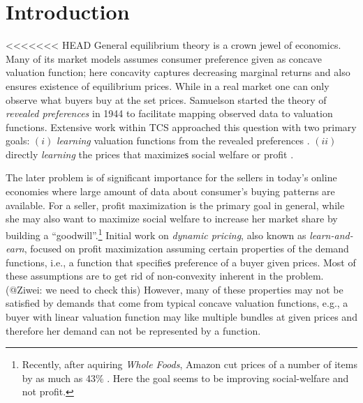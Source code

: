 
\section{Introduction}
<<<<<<< HEAD
General equilibrium theory is a crown jewel of economics. Many of its market models assumes consumer preference given as concave valuation function; here concavity captures decreasing marginal returns and also ensures existence of equilibrium prices.
While in a real market one can only observe what buyers buy at the set prices. Samuelson started the theory of {\em revealed preferences} in 1944 \cite{} to facilitate mapping observed data to valuation functions. Extensive work within TCS approached this question with two primary goals: $(i)$ {\em learning} valuation functions from the revealed preferences \cite{}. $(ii)$ directly {\em learning} the prices that maximizeѕ social welfare or profit \cite{}.

The later problem is of significant importance for the sellers in today's online economies where large amount of data about consumer's buying patterns are available. For a seller, profit maximization is the primary goal in general, while she may also want to maximize social welfare to increase her market share by building a ``goodwill''.\footnote{Recently, after aquiring {\em Whole Foods}, Amazon cut prices of a number of items by as much as 43\% \cite{boomberg,nytimes}. Here the goal seems to be improving social-welfare and not profit.} Initial work on {\em dynamic pricing}, also known as {\em learn-and-earn}, focused on profit maximization assuming certain properties of the demand functions, i.e., a function that specifieѕ preference of a buyer given prices. \alert{Most of these assumptions are to get rid of non-convexity inherent in the problem. (@Ziwei: we need to check this)} However, many of these properties may not be satisfied by demands that come from typical concave valuation functions, e.g., a buyer with linear valuation function may like multiple bundles at given prices and therefore her demand can not be represented by a function.


